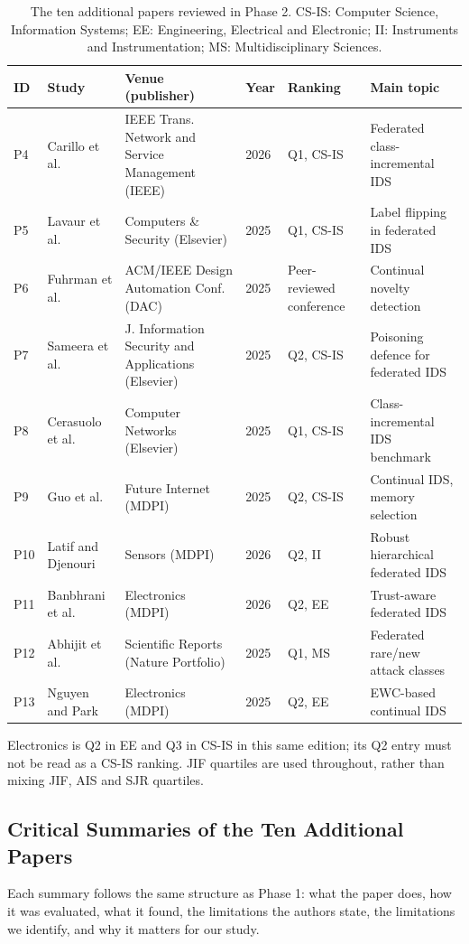 \documentclass[10pt,a4paper]{article}
\begin{document}
\begin{table}[H]
\centering\footnotesize
\caption{The ten additional papers reviewed in Phase 2. CS-IS: Computer Science, Information Systems; EE: Engineering, Electrical and Electronic; II: Instruments and Instrumentation; MS: Multidisciplinary Sciences.}
\label{tab:corpus}
\begin{tabularx}{\linewidth}{L{0.55cm}L{3.3cm}Y L{0.8cm}L{2.9cm}L{2.6cm}}
\toprule
ID & Study & Venue (publisher) & Year & Ranking & Main topic\\
\midrule
P4 & Carillo et al. \cite{carillo} & IEEE Trans. Network and Service Management (IEEE) & 2026 & Q1, CS-IS & Federated class-incremental IDS\\
P5 & Lavaur et al. \cite{lavaur} & Computers \& Security (Elsevier) & 2025 & Q1, CS-IS & Label flipping in federated IDS\\
P6 & Fuhrman et al. \cite{cnd} & ACM/IEEE Design Automation Conf. (DAC) & 2025 & Peer-reviewed conference & Continual novelty detection\\
P7 & Sameera et al. \cite{wei} & J. Information Security and Applications (Elsevier) & 2025 & Q2, CS-IS & Poisoning defence for federated IDS\\
P8 & Cerasuolo et al. \cite{cerasuolo} & Computer Networks (Elsevier) & 2025 & Q1, CS-IS & Class-incremental IDS benchmark\\
P9 & Guo et al. \cite{guo} & Future Internet (MDPI) & 2025 & Q2, CS-IS & Continual IDS, memory selection\\
P10 & Latif and Djenouri \cite{amm} & Sensors (MDPI) & 2026 & Q2, II & Robust hierarchical federated IDS\\
P11 & Banbhrani et al. \cite{flzt} & Electronics (MDPI) & 2026 & Q2, EE & Trust-aware federated IDS\\
P12 & Abhijit et al. \cite{rare} & Scientific Reports (Nature Portfolio) & 2025 & Q1, MS & Federated rare/new attack classes\\
P13 & Nguyen and Park \cite{elgnn} & Electronics (MDPI) & 2025 & Q2, EE & EWC-based continual IDS\\
\bottomrule
\end{tabularx}
\end{table}
\noindent\footnotesize Electronics is Q2 in EE and Q3 in CS-IS in this same edition; its Q2 entry must not be read as a CS-IS ranking. JIF quartiles are used throughout, rather than mixing JIF, AIS and SJR quartiles.\normalsize

\subsection{Critical Summaries of the Ten Additional Papers}
Each summary follows the same structure as Phase 1: what the paper does, how it was evaluated, what it found, the limitations the authors state, the limitations we identify, and why it matters for our study.
\end{document}
